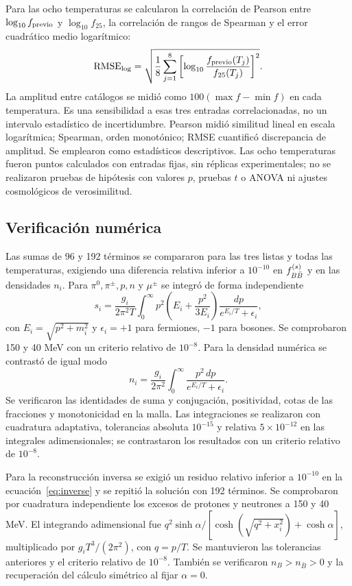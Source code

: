 Para las ocho temperaturas se calcularon la correlación de Pearson entre $\log_{10}f_{\rm previo}$ y $\log_{10}f_{25}$, la correlación de rangos de Spearman y el error cuadrático medio logarítmico:
\begin{equation}
{\rm RMSE}_{\log}=
\sqrt{\frac{1}{8}\sum_{j=1}^{8}
\left[\log_{10}\frac{f_{\rm previo}(T_j)}{f_{25}(T_j)}\right]^2}.
\end{equation}
La amplitud entre catálogos se midió como $100(\max f-\min f)$ en cada temperatura. Es una sensibilidad a esas tres entradas correlacionadas, no un intervalo estadístico de incertidumbre. Pearson midió similitud lineal en escala logarítmica; Spearman, orden monotónico; RMSE cuantificó discrepancia de amplitud. Se emplearon como estadísticos descriptivos. Las ocho temperaturas fueron puntos calculados con entradas fijas, sin réplicas experimentales; no se realizaron pruebas de hipótesis con valores $p$, pruebas $t$ o ANOVA ni ajustes cosmológicos de verosimilitud.

\subsection{Verificación numérica}
Las sumas de 96 y 192 términos se compararon para las tres listas y todas las temperaturas, exigiendo una diferencia relativa inferior a $10^{-10}$ en $f^{(s)}_{B\bar B}$ y en las densidades $n_i$. Para $\pi^0,\pi^\pm,p,n$ y $\mu^\pm$ se integró de forma independiente
\begin{equation}
s_i=\frac{g_i}{2\pi^2T}\int_0^\infty
p^2\left(E_i+\frac{p^2}{3E_i}\right)
\frac{dp}{e^{E_i/T}+\epsilon_i},
\end{equation}
con $E_i=\sqrt{p^2+m_i^2}$ y $\epsilon_i=+1$ para fermiones, $-1$ para bosones. Se comprobaron 150 y 40 MeV con un criterio relativo de $10^{-8}$. Para la densidad numérica se contrastó de igual modo
\begin{equation}
n_i=\frac{g_i}{2\pi^2}\int_0^\infty
\frac{p^2\,dp}{e^{E_i/T}+\epsilon_i}.
\label{eq:numberintegral}
\end{equation}
Se verificaron las identidades de suma y conjugación, positividad, cotas de las fracciones y monotonicidad en la malla. Las integraciones se realizaron con cuadratura adaptativa, tolerancias absoluta $10^{-15}$ y relativa $5\times10^{-12}$ en las integrales adimensionales; se contrastaron los resultados con un criterio relativo de $10^{-8}$.

Para la reconstrucción inversa se exigió un residuo relativo inferior a $10^{-10}$ en la ecuación~\eqref{eq:inverse} y se repitió la solución con 192 términos. Se comprobaron por cuadratura independiente los excesos de protones y neutrones a 150 y 40 MeV. El integrando adimensional fue $q^2\sinh\alpha/[\cosh(\sqrt{q^2+x_i^2})+\cosh\alpha]$, multiplicado por $g_iT^3/(2\pi^2)$, con $q=p/T$. Se mantuvieron las tolerancias anteriores y el criterio relativo de $10^{-8}$. También se verificaron $n_B>n_{\bar B}>0$ y la recuperación del cálculo simétrico al fijar $\alpha=0$.
